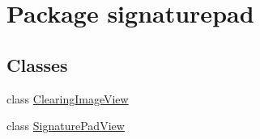 \hypertarget{namespacesignaturepad}{\section{Package signaturepad}
\label{namespacesignaturepad}
}
\subsection*{Classes}
\begin{DoxyCompactItemize}
\item 
class \hyperlink{classsignaturepad_1_1_clearing_image_view}{Clearing\+Image\+View}
\item 
class \hyperlink{classsignaturepad_1_1_signature_pad_view}{Signature\+Pad\+View}
\end{DoxyCompactItemize}
